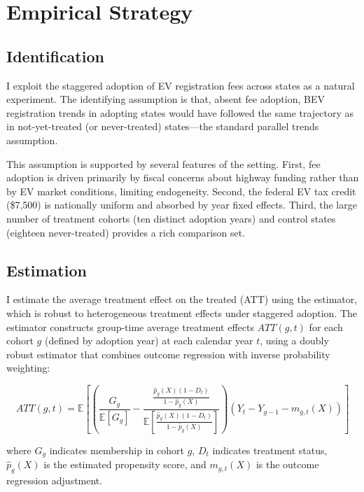 \documentclass[12pt]{article}
\newcommand{\E}{\mathbb{E}}
\begin{document}
\section{Empirical Strategy}
\label{sec:strategy}

\subsection{Identification}

I exploit the staggered adoption of EV registration fees across states as a natural experiment. The identifying assumption is that, absent fee adoption, BEV registration trends in adopting states would have followed the same trajectory as in not-yet-treated (or never-treated) states---the standard parallel trends assumption.

This assumption is supported by several features of the setting. First, fee adoption is driven primarily by fiscal concerns about highway funding rather than by EV market conditions, limiting endogeneity. Second, the federal EV tax credit (\$7,500) is nationally uniform and absorbed by year fixed effects. Third, the large number of treatment cohorts (ten distinct adoption years) and control states (eighteen never-treated) provides a rich comparison set.

\subsection{Estimation}

I estimate the average treatment effect on the treated (ATT) using the \citet{callaway2021difference} estimator, which is robust to heterogeneous treatment effects under staggered adoption. The estimator constructs group-time average treatment effects $ATT(g,t)$ for each cohort $g$ (defined by adoption year) at each calendar year $t$, using a doubly robust estimator that combines outcome regression with inverse probability weighting:

\begin{equation}
ATT(g,t) = \E\left[\left(\frac{G_g}{\E[G_g]} - \frac{\frac{\hat{p}_g(X)(1-D_t)}{1-\hat{p}_g(X)}}{\E\left[\frac{\hat{p}_g(X)(1-D_t)}{1-\hat{p}_g(X)}\right]}\right)(Y_t - Y_{g-1} - m_{g,t}(X))\right]
\end{equation}

\noindent where $G_g$ indicates membership in cohort $g$, $D_t$ indicates treatment status, $\hat{p}_g(X)$ is the estimated propensity score, and $m_{g,t}(X)$ is the outcome regression adjustment.
\end{document}

